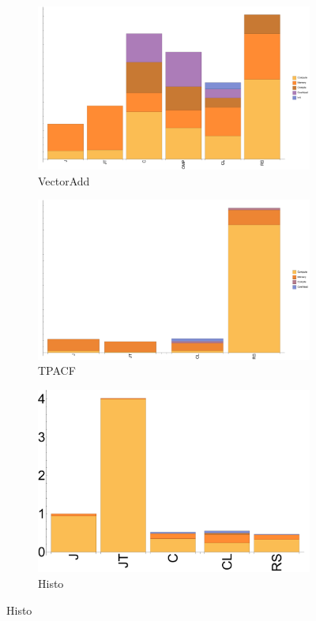 \begin{figure}[ht]
  \begin{subfigure}[b]{0.5\textwidth}
      \centering
      \includegraphics[width=\textwidth]{data/bbattery_vectoradd_nexus5.pdf}
      \caption{VectorAdd}\label{fig:vectoradd}
  \end{subfigure}
  \begin{subfigure}[b]{0.5\textwidth}
      \centering
      \includegraphics[width=\textwidth]{data/bbattery_tpacf_nexus5.pdf}
      \caption{TPACF}
      \label{fig:TPACF}
  \end{subfigure}

  \begin{subfigure}[b]{0.5\textwidth}
      \centering
      \includegraphics[width=\textwidth]{data/bbattery_histogram_nexus5.pdf}
      \caption{Histo}\label{fig:histo}
  \end{subfigure}


\end{figure}
